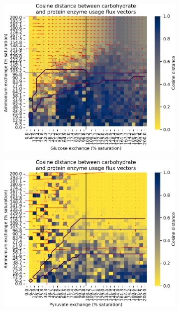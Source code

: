 \begin{figure}
  \centering
  \begin{subfigure}[t]{0.45\textwidth}
  \centering
    \includegraphics[width=\linewidth]{ec_grid_glc_amm_cosine}
    \caption{
    }
    \label{fig:model-noisy-glc-cosine}
  \end{subfigure}%
  \begin{subfigure}[t]{0.45\textwidth}
  \centering
    \includegraphics[width=\linewidth]{ec_grid_pyr_amm_cosine}
    \caption{
    }
    \label{fig:model-noisy-pyr-cosine}
  \end{subfigure}


\end{figure}
